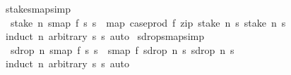 \begin{isabellebody}
\endisatagproof
{\isafoldproof}%
%
\isadelimproof
\isanewline
%
\endisadelimproof
\isanewline
{}\isamarkupfalse%
\ stake{\isacharunderscore}smap{}{\isacharbrackleft}simp{\isacharbrackright}{\isacharcolon}\isanewline
\ \ {\isachardoublequoteopen}stake\ n\ {\isacharparenleft}smap{}\ f\ s{}\ s{}{\isacharparenright}\ {\isacharequal}\ map\ {\isacharparenleft}case{\isacharunderscore}prod\ f{\isacharparenright}\ {\isacharparenleft}zip\ {\isacharparenleft}stake\ n\ s{}{\isacharparenright}\ {\isacharparenleft}stake\ n\ s{}{\isacharparenright}{\isacharparenright}{\isachardoublequoteclose}\isanewline
%
\isadelimproof
\ \ %
\endisadelimproof
%
\isatagproof
{}\isamarkupfalse%
\ {\isacharparenleft}induct\ n\ arbitrary{\isacharcolon}\ s{}\ s{}{\isacharparenright}\ auto%
\endisatagproof
{\isafoldproof}%
%
\isadelimproof
\isanewline
%
\endisadelimproof
\isanewline
{}\isamarkupfalse%
\ sdrop{\isacharunderscore}smap{}{\isacharbrackleft}simp{\isacharbrackright}{\isacharcolon}\isanewline
\ \ {\isachardoublequoteopen}sdrop\ n\ {\isacharparenleft}smap{}\ f\ s{}\ s{}{\isacharparenright}\ {\isacharequal}\ smap{}\ f\ {\isacharparenleft}sdrop\ n\ s{}{\isacharparenright}\ {\isacharparenleft}sdrop\ n\ s{}{\isacharparenright}{\isachardoublequoteclose}\isanewline
%
\isadelimproof
\ \ %
\endisadelimproof
%
\isatagproof
{}\isamarkupfalse%
\ {\isacharparenleft}induct\ n\ arbitrary{\isacharcolon}\ s{}\ s{}{\isacharparenright}\ auto%
\endisatagproof
{\isafoldproof}%
%
\isadelimproof
\isanewline
%
\endisadelimproof
%
\isadelimtheory
\isanewline
%
\endisadelimtheory
%
\isatagtheory
{}\isamarkupfalse%
%
\endisatagtheory
{\isafoldtheory}%
%
\isadelimtheory
%
\endisadelimtheory
%
\end{isabellebody}%
\endinput
